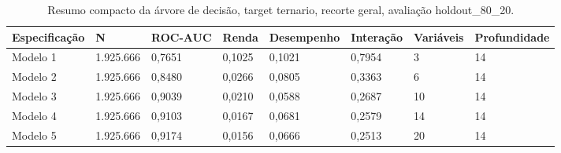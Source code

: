 \begin{table}
\caption{Resumo compacto da árvore de decisão, target ternario, recorte geral, avaliação holdout_80_20.}
\label{tab:tabela_compacta_treeClassification_14_profundidade_ternario_recorte_geral_holdout_80_20}
\begin{tabular}{llllllll}
\toprule
Especificação & N & ROC-AUC & Renda & Desempenho & Interação & Variáveis & Profundidade \\
\midrule
Modelo 1 & 1.925.666 & 0,7651 & 0,1025 & 0,1021 & 0,7954 & 3 & 14 \\
Modelo 2 & 1.925.666 & 0,8480 & 0,0266 & 0,0805 & 0,3363 & 6 & 14 \\
Modelo 3 & 1.925.666 & 0,9039 & 0,0210 & 0,0588 & 0,2687 & 10 & 14 \\
Modelo 4 & 1.925.666 & 0,9103 & 0,0167 & 0,0681 & 0,2579 & 14 & 14 \\
Modelo 5 & 1.925.666 & 0,9174 & 0,0156 & 0,0666 & 0,2513 & 20 & 14 \\
\bottomrule
\end{tabular}
\end{table}
